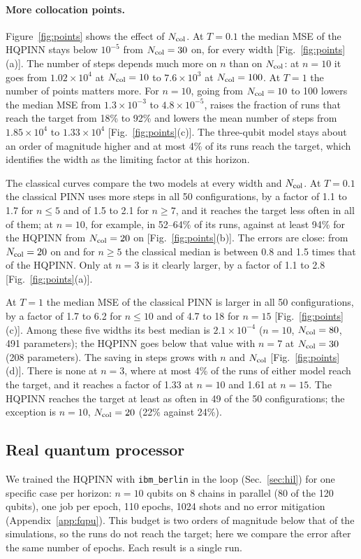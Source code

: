 \documentclass[floatfix,aps,pra,twocolumn,superscriptaddress,10pt,nofootinbib]{revtex4-2}
\newcommand{\Ncol}{N_{\rm col}}
\begin{document}
\paragraph{More collocation points.} Figure~\ref{fig:points} shows the effect of $\Ncol$. At $T=0.1$ the median MSE of the HQPINN stays below $10^{-5}$ from $\Ncol=30$ on, for every width [Fig.~\ref{fig:points}(a)]. The number of steps depends much more on $n$ than on $\Ncol$: at $n=10$ it goes from $1.02\times10^4$ at $\Ncol=10$ to $7.6\times10^3$ at $\Ncol=100$. At $T=1$ the number of points matters more. For $n=10$, going from $\Ncol=10$ to 100 lowers the median MSE from $1.3\times10^{-3}$ to $4.8\times10^{-5}$, raises the fraction of runs that reach the target from 18\% to 92\% and lowers the mean number of steps from $1.85\times10^4$ to $1.33\times10^4$ [Fig.~\ref{fig:points}(c)]. The three-qubit model stays about an order of magnitude higher and at most 4\% of its runs reach the target, which identifies the width as the limiting factor at this horizon.

The classical curves compare the two models at every width and $\Ncol$. At $T=0.1$ the classical PINN uses more steps in all 50 configurations, by a factor of 1.1 to 1.7 for $n\le5$ and of 1.5 to 2.1 for $n\ge7$, and it reaches the target less often in all of them; at $n=10$, for example, in 52--64\% of its runs, against at least 94\% for the HQPINN from $\Ncol=20$ on [Fig.~\ref{fig:points}(b)]. The errors are close: from $\Ncol=20$ on and for $n\ge5$ the classical median is between 0.8 and 1.5 times that of the HQPINN. Only at $n=3$ is it clearly larger, by a factor of 1.1 to 2.8 [Fig.~\ref{fig:points}(a)].

At $T=1$ the median MSE of the classical PINN is larger in all 50 configurations, by a factor of 1.7 to 6.2 for $n\le10$ and of 4.7 to 18 for $n=15$ [Fig.~\ref{fig:points}(c)]. Among these five widths its best median is $2.1\times10^{-4}$ ($n=10$, $\Ncol=80$, 491 parameters); the HQPINN goes below that value with $n=7$ at $\Ncol=30$ (208 parameters). The saving in steps grows with $n$ and $\Ncol$ [Fig.~\ref{fig:points}(d)]. There is none at $n=3$, where at most 4\% of the runs of either model reach the target, and it reaches a factor of 1.33 at $n=10$ and 1.61 at $n=15$. The HQPINN reaches the target at least as often in 49 of the 50 configurations; the exception is $n=10$, $\Ncol=20$ (22\% against 24\%).

\subsection{Real quantum processor}\label{sec:f_qpu}
We trained the HQPINN with \texttt{ibm\_berlin} in the loop (Sec.~\ref{sec:hil}) for one specific case per horizon: $n=10$ qubits on 8 chains in parallel (80 of the 120 qubits), one job per epoch, 110 epochs, 1024 shots and no error mitigation (Appendix~\ref{app:fqpu}). This budget is two orders of magnitude below that of the simulations, so the runs do not reach the target; here we compare the error after the same number of epochs. Each result is a single run.
\end{document}
